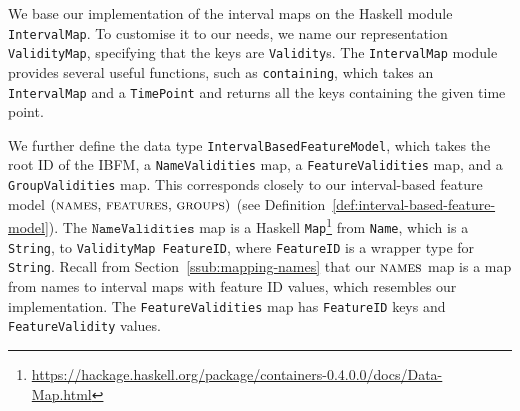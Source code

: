 We base our implementation of the interval maps on the Haskell module \texttt{IntervalMap}. To customise it to our needs, we name our representation \texttt{ValidityMap}, specifying that the keys are \texttt{Validity}s. The \texttt{IntervalMap} module provides several useful functions, such as \texttt{containing}, which takes an \texttt{IntervalMap} and a \texttt{TimePoint} and returns all the keys containing the given time point.

We further define the data type \texttt{IntervalBasedFeatureModel}, which takes the root ID of the IBFM, a \texttt{NameValidities} map, a \texttt{FeatureValidities} map, and a \texttt{GroupValidities} map. This corresponds closely to our interval-based feature model  $(\textsc{names},\,\allowbreak\textsc{features},\, \textsc{groups}{})$ (see Definition~\vref{def:interval-based-feature-model}). The $\texttt{NameValidities}$ map is a Haskell \texttt{Map}\footnote{\url{https://hackage.haskell.org/package/containers-0.4.0.0/docs/Data-Map.html}} from \texttt{Name}, which is a \texttt{String}, to \texttt{ValidityMap FeatureID}, where \texttt{FeatureID} is a wrapper type for \texttt{String}. Recall from Section~\vref{ssub:mapping-names} that our $\textsc{names}{}$ map is a map from names to interval maps with feature ID values, which resembles our implementation. The \texttt{FeatureValidities} map has \texttt{FeatureID} keys and \texttt{FeatureValidity} values. 
